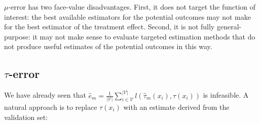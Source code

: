 \begin{comment}
At first glance, this does not appear to relate to the quantity in equation \ref{te-error}. However, if the loss is of the form $l(f,y) = g(|f-y|)$ (e.g. quadratic loss), we can expand this expression by subtracting the predicted counterfactual mean outcome $\hat\mu_{1-w_i}(x_i)$ from both arguments of the loss function and multiplying both arguments by $(2w_i -1)$, which is always $1$ or $-1$.

\begin{equation}
	\check e = \frac{1}{|\mathcal{V}|} \sum_{i \in \mathcal{V}}^{|\mathcal{V}|}  
	l( \ 
	\underbrace{(2w_i -1) (\hat\mu_{w_i} (x_i) - \hat\mu_{1-w_i}(x_i))}_{\hat\tau(x_i)}, 
	\underbrace{(2w_i -1) (y_i - \hat\mu_{1-w_i}(x_i))}_{\check\tau_i}
	) 
\label{pred-error-expansion}
\end{equation}

Now we recognize that the first argument $(2w_i -1) (\hat\mu_{w_i} (x_i) - \hat\mu_{1-w_i}(x_i))$ reduces to $\hat\mu_1 (x_i) - \hat\mu_0(x_i) = \hat\tau(x_i)$, which is the treatment effect estimate from our model. The second argument is the difference between the observed outcome $y_i$ and the counterfactual prediction from our model $\hat\mu_{1-w_i}(x_i)$. We can interpret this difference as an estimate of $\tau(x_i)$. 

Comparing equation \ref{pred-error-expansion} to equation \ref{te-error} shows that if we use outcome prediction error to select among treatment effect models, we are ignoring any error in the prediction of the counterfactual outcomes in the validation set. 
\end{comment}

$\mu$-error has two face-value disadvantages. First, it does not target the function of interest: the best available estimators for the potential outcomes may not make for the best estimator of the treatment effect. Second, it is not fully general-purpose: it may not make sense to evaluate targeted estimation methods that do not produce useful estimates of the potential outcomes in this way.

\subsection{$\tau$-error}

We have already seen that $\hat e_m = \frac{1}{|\mathcal{V}|}\sum_{i \in \mathcal{V}}^{|\mathcal{V}|}  l(\hat \tau_m (x_i), \tau(x_i))$ is infeasible. A natural approach is to replace $\tau(x_i)$ with an estimate derived from the validation set:

